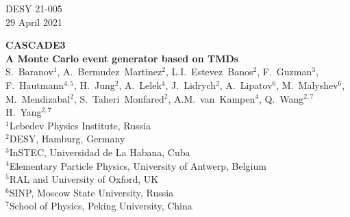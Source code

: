 \documentclass[11pt]{article} \usepackage{mystyle-new}
\def\prp{t}
\def\kt{\ensuremath{k_{\prp}}}
\def\cascade{{\sc Cascade3}}
\begin{document}
%
\begin{flushright}
DESY 21-005\\
29 April 2021
\end{flushright}
\begin{center} {\sffamily\Large\bfseries 
CASCADE3 \\ \vspace*{0.2cm}
A Monte Carlo event generator based on TMDs \\ \vspace*{0.2cm}
}
{ 
 \Large 
S.~Baranov$^1$, 
A.~Bermudez~Martinez$^{2}$, 
L.I.~Estevez~Banos$^{2}$,
F.~Guzman$^3$, 
F.~Hautmann$^{4,5}$,
H.~Jung$^{2}$,
A.~Lelek$^{4}$,
J.~Lidrych$^{2}$,
A.~Lipatov$^6$, 
M.~Malyshev$^6$,
M.~Mendizabal$^2$, 
S.~Taheri~Monfared$^{2}$,
A.M.~van~Kampen$^4$, 
Q.~Wang$^{2,7}$
H.~Yang$^{2,7}$
}\\  \vspace*{0.2cm}
     {\large $^1$Lebedev Physics Institute, Russia }\\
      {\large $^2$DESY, Hamburg, Germany}\\
     {\large $^3$InSTEC, Universidad de La Habana, Cuba}\\
    {\large $^4$Elementary Particle Physics, University of Antwerp, Belgium}\\
    {\large $^5$RAL and University of Oxford, UK} \\
    {\large $^6$SINP, Moscow State University, Russia }\\
    {\large $^7$School of Physics, Peking University, China} \\  

\end{center}

\begin{abstract}

The  \cascade\ Monte Carlo event generator based on Transverse Momentum Dependent (TMD) parton densities is described. 
Hard processes which are generated in collinear factorization with LO multileg or NLO parton level generators are extended by 
adding transverse momenta to the initial partons according to TMD densities and applying dedicated TMD parton showers and hadronization.
Processes with off-shell kinematics within \kt-factorization, either internally implemented  or from external packages via LHE files, can be processed for parton showering and hadronization.
The initial state parton shower is tied to the TMD parton distribution, with all parameters fixed by the TMD distribution.
\end{abstract} 
\end{document}
